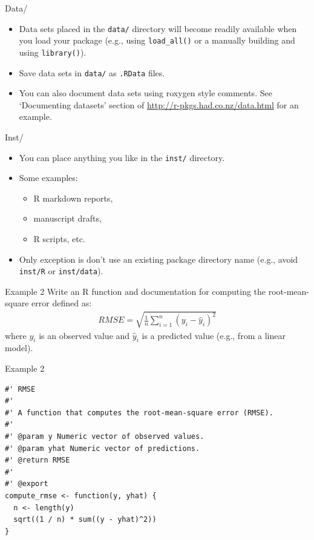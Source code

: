 \documentclass{beamer}
\begin{document}
\begin{frame}{Data/}
\begin{itemize}
\item Data sets placed in the \texttt{data/} directory will become readily available when you load your package (e.g., using \texttt{load\_all()} or a manually building and using \texttt{library()}).
\vspace{1ex}
\item Save data sets in \texttt{data/} as \texttt{.RData} files. 
\vspace{1ex}
\item You can also document data sets using roxygen style comments.  See `Documenting datasets' section of \url{http://r-pkgs.had.co.nz/data.html} for an example.
\end{itemize}
\end{frame}

\begin{frame}{Inst/}
\begin{itemize}
\item You can place anything you like in the \texttt{inst/} directory.
\vspace{1ex}
\item Some examples:
\begin{itemize}
\item R markdown reports,
\item manuscript drafts,
\item R scripts, etc.
\end{itemize}
\vspace{1ex}
\item Only exception is don't use an existing package directory name (e.g., avoid \texttt{inst/R} or \texttt{inst/data}).
\end{itemize}
\end{frame}

\begin{frame}{Example 2}
Write an R function and documentation for computing the root-mean-square error defined as:
\begin{align*}
RMSE = \sqrt{\frac{1}{n}\sum_{i=1}^n (y_i - \hat{y}_i)^2}
\end{align*} 
where $y_i$ is an observed value and $\hat{y}_i$ is a predicted value (e.g., from a linear model).
\end{frame}

\begin{frame}[fragile]{Example 2}
\small
\begin{verbatim}
#' RMSE
#' 
#' A function that computes the root-mean-square error (RMSE).
#' 
#' @param y Numeric vector of observed values.
#' @param yhat Numeric vector of predictions.
#' @return RMSE
#'   
#' @export
compute_rmse <- function(y, yhat) {
  n <- length(y)
  sqrt((1 / n) * sum((y - yhat)^2))
}
\end{verbatim}
\end{frame}
\end{document}
